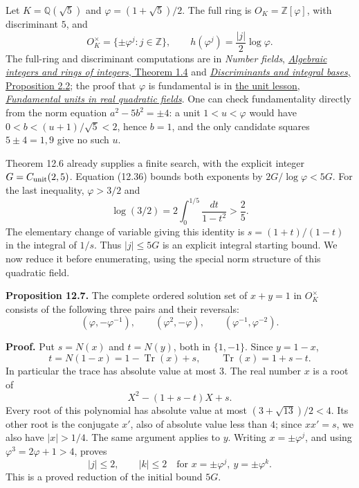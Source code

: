 \documentclass[
  11pt,
  a4paper,
]{article}
\begin{document}
Let \(K=\mathbb Q(\sqrt5)\) and \(\varphi=(1+\sqrt5)/2\). The full ring
is \(O_K=\mathbb Z[\varphi]\), with discriminant \(5\), and \[
O_K^\times=\{\pm\varphi^j:j\in\mathbb Z\},\qquad
h(\varphi^j)=\frac{|j|}{2}\log\varphi.
\tag{12.36}
\] The full-ring and discriminant computations are in \emph{Number
fields},
\href{https://kokunoyumeto.github.io/open-math-courses-public/courses/NT-ANT/algebraic-integers-and-rings-of-integers.html}{\emph{Algebraic
integers and rings of integers}, Theorem 1.4} and
\href{https://kokunoyumeto.github.io/open-math-courses-public/courses/NT-ANT/discriminants-and-integral-bases.html}{\emph{Discriminants
and integral bases}, Proposition 2.2}; the proof that \(\varphi\) is
fundamental is in
\href{https://kokunoyumeto.github.io/open-math-courses-public/courses/NT-ANT/dirichlets-unit-theorem.html\#fundamental-units-in-real-quadratic-fields}{the
unit lesson, \emph{Fundamental units in real quadratic fields}}. One can
check fundamentality directly from the norm equation \(a^2-5b^2=\pm4\):
a unit \(1<u<\varphi\) would have \(0<b<(u+1)/\sqrt5<2\), hence \(b=1\),
and the only candidate squares \(5\pm4=1,9\) give no such \(u\).

Theorem 12.6 already supplies a finite search, with the explicit integer
\(G=C_{\rm unit}(2,5)\). Equation (12.36) bounds both exponents by
\(2G/\log\varphi<5G\). For the last inequality, \(\varphi>3/2\) and \[
\log(3/2)=2\int_0^{1/5}\frac{dt}{1-t^2}>\frac25.
\] The elementary change of variable giving this identity is
\(s=(1+t)/(1-t)\) in the integral of \(1/s\). Thus \(|j|\le5G\) is an
explicit integral starting bound. We now reduce it before enumerating,
using the special norm structure of this quadratic field.

\textbf{Proposition 12.7.} The complete ordered solution set of
\(x+y=1\) in \(O_K^\times\) consists of the following three pairs and
their reversals: \[
(\varphi,-\varphi^{-1}),\qquad
(\varphi^2,-\varphi),\qquad
(\varphi^{-1},\varphi^{-2}).
\tag{12.37}
\]

\textbf{Proof.} Put \(s=N(x)\) and \(t=N(y)\), both in \(\{1,-1\}\).
Since \(y=1-x\), \[
t=N(1-x)=1-\operatorname{Tr}(x)+s,\qquad
\operatorname{Tr}(x)=1+s-t.
\tag{12.38}
\] In particular the trace has absolute value at most \(3\). The real
number \(x\) is a root of \[
X^2-(1+s-t)X+s.
\tag{12.39}
\] Every root of this polynomial has absolute value at most
\((3+\sqrt{13})/2<4\). Its other root is the conjugate \(x'\), also of
absolute value less than \(4\); since \(xx'=s\), we also have
\(|x|>1/4\). The same argument applies to \(y\). Writing
\(x=\pm\varphi^j\), and using \(\varphi^3=2\varphi+1>4\), proves \[
|j|\le2,\qquad |k|\le2
\quad\text{for }x=\pm\varphi^j,\ y=\pm\varphi^k.
\tag{12.40}
\] This is a proved reduction of the initial bound \(5G\).
\end{document}
